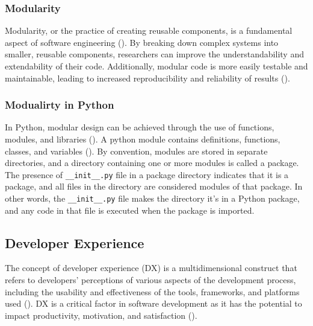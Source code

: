 \subsubsection{Modularity}
Modularity, or the practice of creating reusable components, is a fundamental aspect of software engineering (\cite{pressman2010software}). By breaking down complex systems into smaller, reusable components, researchers can improve the understandability and extendability of their code. Additionally, modular code is more easily testable and maintainable, leading to increased reproducibility and reliability of results (\cite{amershi2019software,pressman2010software}). 
\subsubsection{Modualirty in Python}
In Python, modular design can be achieved through the use of functions, modules, and libraries (\cite{sanner1999python}). 
A python module contains definitions, functions, classes, and variables (\cite{raschka2015python}). By convention, modules are stored in separate directories, and a directory containing one or more modules is called a package. The presence of \verb|__init__.py| file in a package directory indicates that it is a package, and all files in the directory are considered modules of that package. In other words, the \verb|__init__.py| file makes the directory it's in a Python package, and any code in that file is executed when the package is imported.



\subsection{Developer Experience}
The concept of developer experience (DX) is a multidimensional construct that refers to developers' perceptions of various aspects of the development process, including the usability and effectiveness of the tools, frameworks, and platforms used (\cite{fagerholm2012developer}). DX is a critical factor in software development as it has the potential to impact productivity, motivation, and satisfaction (\cite{fagerholm2012developer}).


